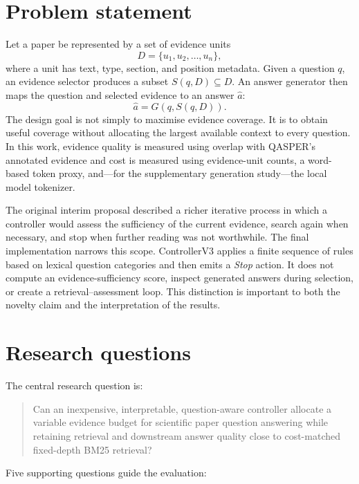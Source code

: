 \section{Problem statement}

Let a paper be represented by a set of evidence units
\begin{equation}
    D = \{u_1,u_2,\ldots,u_n\},
\end{equation}
where a unit has text, type, section, and position metadata. Given a question $q$, an evidence selector produces a subset $S(q,D)\subseteq D$. An answer generator then maps the question and selected evidence to an answer $\hat{a}$:
\begin{equation}
    \hat{a}=G(q,S(q,D)).
\end{equation}
The design goal is not simply to maximise evidence coverage. It is to obtain useful coverage without allocating the largest available context to every question. In this work, evidence quality is measured using overlap with QASPER's annotated evidence and cost is measured using evidence-unit counts, a word-based token proxy, and---for the supplementary generation study---the local model tokenizer.

The original interim proposal described a richer iterative process in which a controller would assess the sufficiency of the current evidence, search again when necessary, and stop when further reading was not worthwhile. The final implementation narrows this scope. ControllerV3 applies a finite sequence of rules based on lexical question categories and then emits a \emph{Stop} action. It does not compute an evidence-sufficiency score, inspect generated answers during selection, or create a retrieval--assessment loop. This distinction is important to both the novelty claim and the interpretation of the results.

\section{Research questions}

The central research question is:

\begin{quote}
Can an inexpensive, interpretable, question-aware controller allocate a variable evidence budget for scientific paper question answering while retaining retrieval and downstream answer quality close to cost-matched fixed-depth BM25 retrieval?
\end{quote}

Five supporting questions guide the evaluation:

